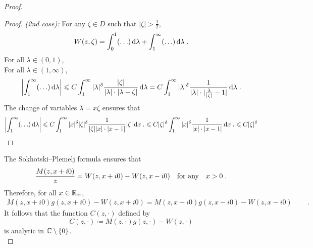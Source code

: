 \begin{proof}
\begin{proof}
\textit{(2nd case):} For any $\zeta \in D$ such that $|\zeta| > \frac{1}{2}$, 
\begin{align*}
    W(z, \zeta) = \int_0^{1} (\ldots)\,\mathrm{d} \lambda + \int_1^\infty (\ldots) \,\mathrm{d} \lambda \; .
\end{align*} 
For all $\lambda \in (0,1)$, \\
For all $\lambda \in (1, \infty)$, 
   $$\left| \int_1^\infty (\ldots) \,\mathrm{d} \lambda \right|
   \leqslant C \int_1^\infty |\lambda|^\delta \frac{|\zeta|} {|\lambda|\cdot|\lambda-\zeta|} \,\mathrm{d} \lambda  
   = C \int_1^\infty |\lambda|^\delta \frac{1} {|\lambda|\cdot|\frac{\lambda}{|\zeta|}-1|} \,\mathrm{d} \lambda \; .$$
The change of variables $\lambda = x \zeta$ ensures that 
    $$ 
    \left| \int_1^\infty (\ldots) \,\mathrm{d} \lambda \right|
    \leqslant 
    C \int_1^\infty |x|^\delta |\zeta|^\delta \frac{1} {|\zeta||x|\cdot|x-1|} |\zeta|\,\mathrm{d} x \; .
    \leqslant 
    C |\zeta|^\delta \int_1^\infty |x|^\delta \frac{1}{|x|\cdot|x-1|}\,\mathrm{d} x \; .
    \leqslant C |\zeta|^\delta
    $$
\end{proof}

The Sokhotski--Plemelj formula ensures that 
\begin{align*}
    \frac{M(z,x+i0)}{z}
    = 
    W(z,x+i0) - W(z,x-i0)
    \quad \text{for any} \quad
    x > 0
    \; .
\end{align*}
Therefore, for all $x\in\mathbb{R}_+$, 
\begin{align*}
    M(z,x+i0)g(z, x+i0) -W(z,x+i0) = M(z,x-i0)g(z, x-i0) - W(z,x-i0) \, \qquad \text{}.
\end{align*}
It follows that the function $C(z,\cdot)$ defined by 
$$ C(z,\cdot) \coloneqq M(z,\cdot)g(z,\cdot) - W(z,\cdot)$$
is analytic in $\mathbb{C} \setminus \{0\}$.\\



\end{proof}
